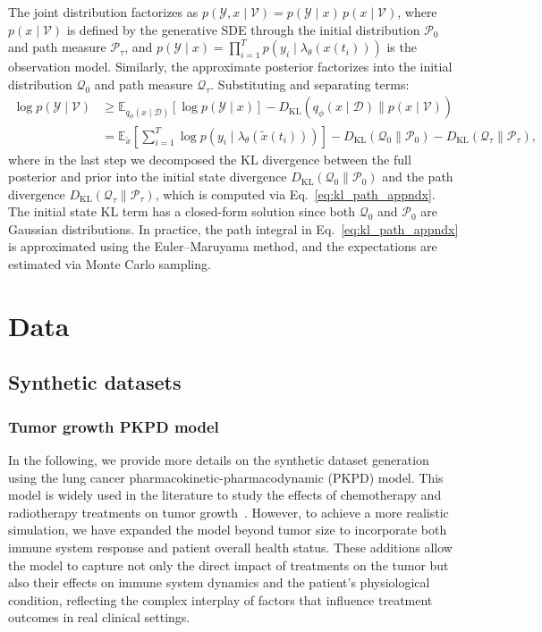 \documentclass[preprint,12pt]{elsarticle}
\begin{document}
The joint distribution factorizes as $p(\mathcal{Y}, x \mid \mathcal{V}) = p(\mathcal{Y} \mid x) \, p(x \mid \mathcal{V})$, where $p(x \mid \mathcal{V})$ is defined by the generative SDE through the initial distribution $\mathcal{P}_0$ and path measure $\mathcal{P}_\tau$, and $p(\mathcal{Y} \mid x) = \prod_{i=1}^{T} p(y_i \mid \lambda_\theta(x(t_i)))$ is the observation model. Similarly, the approximate posterior factorizes into the initial distribution $\mathcal{Q}_0$ and path measure $\mathcal{Q}_\tau$. Substituting and separating terms:
\begin{align}
    \log p(\mathcal{Y} \mid \mathcal{V}) &\geq \mathbb{E}_{q_\phi(x \mid \mathcal{D})} \left[ \log p(\mathcal{Y} \mid x) \right] - D_{\mathrm{KL}}(q_\phi(x \mid \mathcal{D}) \parallel p(x \mid \mathcal{V})) \nonumber \\
    &= \mathbb{E}_{\tilde{x}} \left[ \sum_{i=1}^{T} \log p(y_i \mid \lambda_\theta(\tilde{x}(t_i))) \right] - D_{\mathrm{KL}}(\mathcal{Q}_0 \| \mathcal{P}_0) - D_{\mathrm{KL}}(\mathcal{Q}_\tau \| \mathcal{P}_\tau),
    \label{eq:elbo_appndx}
\end{align}
where in the last step we decomposed the KL divergence between the full posterior and prior into the initial state divergence $D_{\mathrm{KL}}(\mathcal{Q}_0 \| \mathcal{P}_0)$ and the path divergence $D_{\mathrm{KL}}(\mathcal{Q}_\tau \| \mathcal{P}_\tau)$, which is computed via Eq.~\eqref{eq:kl_path_appndx}. The initial state KL term has a closed-form solution since both $\mathcal{Q}_0$ and $\mathcal{P}_0$ are Gaussian distributions. In practice, the path integral in Eq.~\eqref{eq:kl_path_appndx} is approximated using the Euler--Maruyama method, and the expectations are estimated via Monte Carlo sampling.
\section{Data}
\label{appndx:data}
\subsection{Synthetic datasets}
\subsubsection{Tumor growth PKPD model}
\label{appndx:synthetic_dataset}
In the following, we provide more details on the synthetic dataset generation using the lung cancer pharmacokinetic-pharmacodynamic (PKPD) model. This model is widely used in the literature to study the effects of chemotherapy and radiotherapy treatments on tumor growth~\citep{kacprzyk2024ode}. However, to achieve a more realistic simulation, we have expanded the model beyond tumor size to incorporate both immune system response and patient overall health status. These additions allow the model to capture not only the direct impact of treatments on the tumor but also their effects on immune system dynamics and the patient’s physiological condition, reflecting the complex interplay of factors that influence treatment outcomes in real clinical settings.
\end{document}
